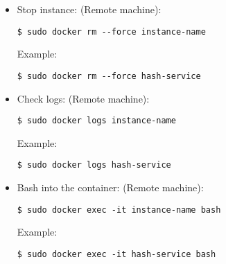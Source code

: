 \begin{itemize}
\item Stop instance: (Remote machine):

\begin{verbatim}
$ sudo docker rm --force instance-name
\end{verbatim}
Example:
\begin{verbatim}
$ sudo docker rm --force hash-service
\end{verbatim}

\item Check logs: (Remote machine):

\begin{verbatim}
$ sudo docker logs instance-name
\end{verbatim}
Example:
\begin{verbatim}
$ sudo docker logs hash-service
\end{verbatim}

\item Bash into the container: (Remote machine):

\begin{verbatim}
$ sudo docker exec -it instance-name bash
\end{verbatim}
Example:
\begin{verbatim}
$ sudo docker exec -it hash-service bash
\end{verbatim}

\end{itemize}
	